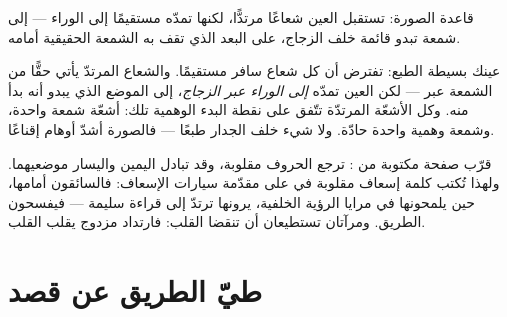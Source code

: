 \begin{omfigure}

{\small قاعدة الصورة: تستقبل العين شعاعًا مرتدًّا، لكنها تمدّه
مستقيمًا إلى الوراء --- إلى شمعة تبدو قائمة خلف الزجاج، على
البعد الذي تقف به الشمعة الحقيقية أمامه.}
\end{omfigure}

\begin{example}\label{ex:g5:mirrors-reflection:why}
عينك بسيطة الطبع: تفترض أن كل شعاع سافر مستقيمًا. والشعاع
المرتدّ يأتي حقًّا من الشمعة عبر  --- لكن العين تمدّه
\emph{إلى الوراء عبر الزجاج}، إلى الموضع الذي يبدو أنه بدأ منه.
وكل الأشعّة المرتدّة تتّفق على نقطة البدء الوهمية تلك: أشعّة
شمعة واحدة، وشمعة وهمية واحدة حادّة. ولا شيء خلف الجدار طبعًا
--- فالصورة أشدّ أوهام  إقناعًا.
\end{example}

\begin{example}\label{ex:g5:mirrors-reflection:swap}
قرّب صفحة مكتوبة من : ترجع الحروف مقلوبة، وقد تبادل اليمين
واليسار موضعيهما. ولهذا تُكتب كلمة إسعاف مقلوبة في  على
مقدّمة سيارات الإسعاف: فالسائقون أمامها، حين يلمحونها في مرايا
الرؤية الخلفية، يرونها ترتدّ إلى قراءة سليمة --- فيفسحون الطريق.
ومرآتان تستطيعان أن تنقضا القلب: فارتداد مزدوج يقلب القلب.
\end{example}

\section{طيّ الطريق عن قصد}

